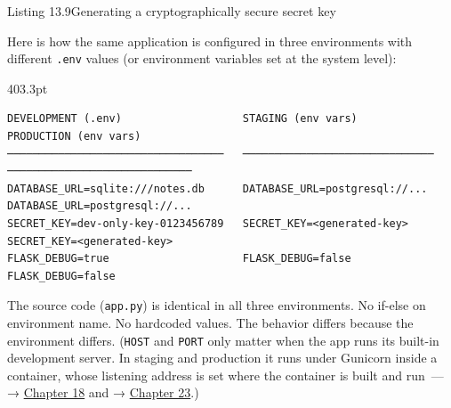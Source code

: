 \begin{codeboxcap}[short]{\textcolor{accent}{Listing 13.9}\enspace Generating a cryptographically secure secret key}

\begin{Shaded}
\begin{Highlighting}[]

\NormalTok{))}
\end{Highlighting}
\end{Shaded}

\end{codeboxcap}

\label{13-configuration-externalization:managing-configurations-across-environments}

Here is how the same application is configured in three environments with different \texttt{.env} values (or environment variables set at the system level):

\begin{diagrambox}[short]{403.3pt}
\begin{Verbatim}[fontsize=\fontsize{7.7}{7.31}\selectfont]
DEVELOPMENT (.env)                   STAGING (env vars)               PRODUCTION (env vars)
──────────────────────────────────   ──────────────────────────────   ─────────────────────────────
DATABASE_URL=sqlite:///notes.db      DATABASE_URL=postgresql://...    DATABASE_URL=postgresql://...
SECRET_KEY=dev-only-key-0123456789   SECRET_KEY=<generated-key>       SECRET_KEY=<generated-key>
FLASK_DEBUG=true                     FLASK_DEBUG=false                FLASK_DEBUG=false
\end{Verbatim}
\end{diagrambox}

\noindent{}The source code (\texttt{app.py}) is identical in all three environments. No if-else on environment name. No hardcoded values. The behavior differs because the environment differs. (\texttt{HOST} and \texttt{PORT} only matter when the app runs its built-in development server. In staging and production it runs under Gunicorn inside a container, whose listening address is set where the container is built and run~--- → \hyperref[ch:18-containerization]{Chapter 18} and → \hyperref[ch:23-code-transfer]{Chapter 23}.)

